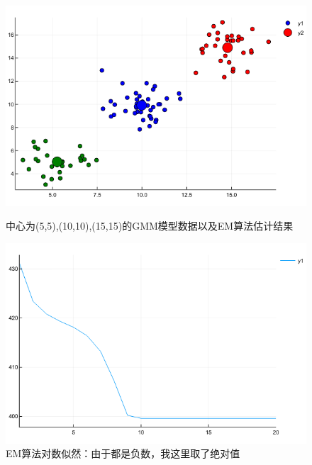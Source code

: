 \documentclass{ML}
\begin{document}
\begin{figure}[H]
	\begin{minipage}[c]{0.5\linewidth}
		\centering
		\includegraphics[width=0.9\linewidth]{media/GMM/em}
		\caption{中心为(5,5),(10,10),(15,15)的GMM模型数据以及EM算法估计结果}
		\label{fig:gmm-em}
	\end{minipage}
	\begin{minipage}[c]{0.5\linewidth}
		\centering
		\includegraphics[width=0.9\linewidth]{media/GMM/loss}
		\caption{EM算法对数似然：由于都是负数，我这里取了绝对值}
		\label{fig:gmm-em-loss}
	\end{minipage}
\end{figure}
\end{document}
